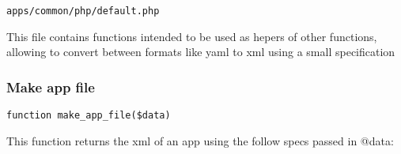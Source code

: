 \documentclass[a4paper]{article}
\begin{document}
\begin{lstlisting}
apps/common/php/default.php
\end{lstlisting}

This file contains functions intended to be used as hepers of other functions,
allowing to convert between formats like yaml to xml using a small specification

\hypertarget{toc28}{}
\subsubsection{Make app file}

\begin{lstlisting}
function make_app_file($data)
\end{lstlisting}

This function returns the xml of an app using the follow specs passed in @data:
\end{document}
